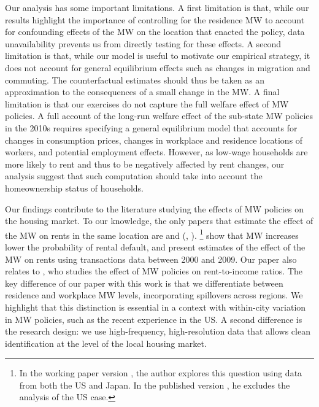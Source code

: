 Our analysis has some important limitations.
A first limitation is that, while our results highlight the importance of 
controlling for the residence MW to account for confounding effects of the MW
on the location that enacted the policy, data unavailability prevents us from
directly testing for these effects.
A second limitation is that, while our model is useful to motivate our 
empirical strategy, it does not account for general equilibrium effects such 
as changes in migration and commuting.
The counterfactual estimates should thus be taken as an approximation to the 
consequences of a small change in the MW.
A final limitation is that our exercises do not capture the full welfare 
effect of MW policies.
A full account of the long-run welfare effect of the sub-state MW policies in 
the 2010s requires specifying a general equilibrium model that accounts for 
changes in consumption prices, changes in workplace and residence locations
of workers, and potential employment effects.
However, as low-wage households are more likely to rent and thus to be 
negatively affected by rent changes, our analysis suggest that such computation 
should take into account the homeownership status of households.


Our findings contribute to the literature studying the effects of MW policies 
on the housing market.
To our knowledge, the only papers that estimate the effect of the MW on rents 
in the same location are \textcite{Tidemann2018} and \citeauthor{Yamagishi2019} 
(\cite*{Yamagishi2019}, \cite*{Yamagishi2021}).%
\footnote{In the working paper version \parencite{Yamagishi2019}, the author 
	explores this question using data from both the US and Japan.
	In the published version \parencite{Yamagishi2021}, he excludes the analysis 
	of the US case.}
\textcite{AgarwalEtAl2021} show that MW increases lower the probability of 
rental default, and present estimates of the effect of the MW on rents using 
transactions data between 2000 and 2009.
Our paper also relates to \textcite{Hughes2020}, who studies the effect of 
MW policies on rent-to-income ratios.
The key difference of our paper with this work is that we differentiate 
between residence and workplace MW levels, incorporating spillovers across 
regions.
We highlight that this distinction is essential in a context with within-city
variation in MW policies, such as the recent experience in the US.
A second difference is the research design: we use high-frequency,
high-resolution data that allows clean identification at the level of the 
local housing market.

